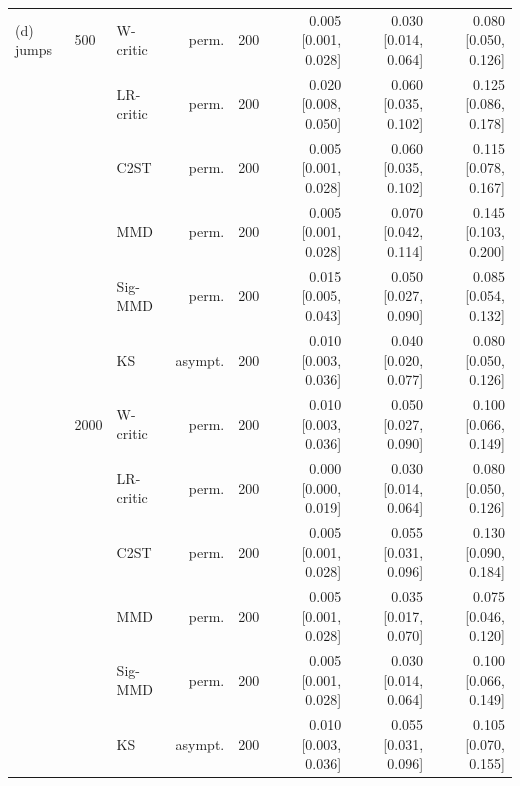 \begin{tabular}{lllrrrrr}
(d) jumps & 500 & W-critic & perm. & 200 & 0.005 [0.001, 0.028] & 0.030 [0.014, 0.064] & 0.080 [0.050, 0.126] \\
 &  & LR-critic & perm. & 200 & 0.020 [0.008, 0.050] & 0.060 [0.035, 0.102] & 0.125 [0.086, 0.178] \\
 &  & C2ST & perm. & 200 & 0.005 [0.001, 0.028] & 0.060 [0.035, 0.102] & 0.115 [0.078, 0.167] \\
 &  & MMD & perm. & 200 & 0.005 [0.001, 0.028] & 0.070 [0.042, 0.114] & 0.145 [0.103, 0.200] \\
 &  & Sig-MMD & perm. & 200 & 0.015 [0.005, 0.043] & 0.050 [0.027, 0.090] & 0.085 [0.054, 0.132] \\
 &  & KS & asympt. & 200 & 0.010 [0.003, 0.036] & 0.040 [0.020, 0.077] & 0.080 [0.050, 0.126] \\
 & 2000 & W-critic & perm. & 200 & 0.010 [0.003, 0.036] & 0.050 [0.027, 0.090] & 0.100 [0.066, 0.149] \\
 &  & LR-critic & perm. & 200 & 0.000 [0.000, 0.019] & 0.030 [0.014, 0.064] & 0.080 [0.050, 0.126] \\
 &  & C2ST & perm. & 200 & 0.005 [0.001, 0.028] & 0.055 [0.031, 0.096] & 0.130 [0.090, 0.184] \\
 &  & MMD & perm. & 200 & 0.005 [0.001, 0.028] & 0.035 [0.017, 0.070] & 0.075 [0.046, 0.120] \\
 &  & Sig-MMD & perm. & 200 & 0.005 [0.001, 0.028] & 0.030 [0.014, 0.064] & 0.100 [0.066, 0.149] \\
 &  & KS & asympt. & 200 & 0.010 [0.003, 0.036] & 0.055 [0.031, 0.096] & 0.105 [0.070, 0.155] \\
\bottomrule
\end{tabular}
